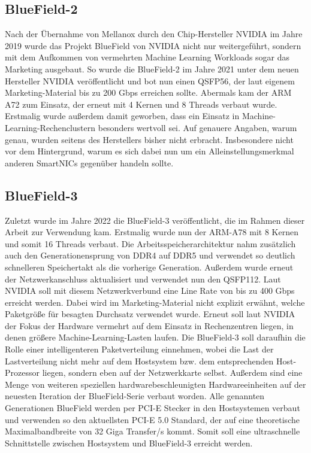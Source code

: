 \subsection{BlueField-2}
Nach der Übernahme von Mellanox durch den Chip-Hersteller NVIDIA im Jahre 2019 wurde das Projekt BlueField von NVIDIA nicht nur weitergeführt, sondern mit dem Aufkommen von vermehrten Machine Learning Workloads sogar das Marketing ausgebaut. So wurde die BlueField-2 im Jahre 2021 unter dem neuen Hersteller NVIDIA veröffentlicht und bot nun einen QSFP56, der laut eigenem Marketing-Material bis zu 200 Gbps erreichen sollte. Abermals kam der ARM A72 zum Einsatz, der erneut mit 4 Kernen und 8 Threads verbaut wurde. Erstmalig wurde außerdem damit geworben, dass ein Einsatz in Machine-Learning-Rechenclustern besonders wertvoll sei. Auf genauere Angaben, warum genau, wurden seitens des Herstellers bisher nicht erbracht. Insbesondere nicht vor dem Hintergrund, warum es sich dabei nun um ein Alleinstellungsmerkmal anderen SmartNICs gegenüber handeln sollte.
\subsection{BlueField-3}
Zuletzt wurde im Jahre 2022 die BlueField-3 veröffentlicht, die im Rahmen dieser Arbeit zur Verwendung kam. Erstmalig wurde nun der ARM-A78 mit 8 Kernen und somit 16 Threads verbaut. Die Arbeitsspeicherarchitektur nahm zusätzlich auch den Generationensprung von DDR4 auf DDR5 und verwendet so deutlich schnelleren Speichertakt als die vorherige Generation. Außerdem wurde erneut der Netzwerkanschluss aktualisiert und verwendet nun den QSFP112. Laut NVIDIA soll mit diesem Netzwerkverbund eine Line Rate von bis zu 400 Gbps erreicht werden. Dabei wird im Marketing-Material nicht explizit erwähnt, welche Paketgröße für besagten Durchsatz verwendet wurde. Erneut soll laut NVIDIA der Fokus der Hardware vermehrt auf dem Einsatz in Rechenzentren liegen, in denen größere Machine-Learning-Lasten laufen. Die BlueField-3 soll daraufhin die Rolle einer intelligenteren Paketverteilung einnehmen, wobei die Last der Lastverteilung nicht mehr auf dem Hostsystem bzw. dem entsprechenden Host-Prozessor liegen, sondern eben auf der Netzwerkkarte selbst. Außerdem sind eine Menge von weiteren speziellen hardwarebeschleunigten Hardwareeinheiten auf der neuesten Iteration der BlueField-Serie verbaut worden. Alle genannten Generationen BlueField werden per PCI-E Stecker in den Hostsystemen verbaut und verwenden so den aktuellsten PCI-E 5.0 Standard, der auf eine theoretische Maximalbandbreite von 32 Giga Transfer/s kommt. Somit soll eine ultraschnelle Schnittstelle zwischen Hostsystem und BlueField-3 erreicht werden.
